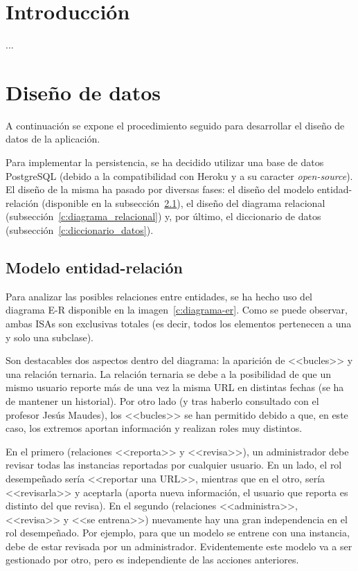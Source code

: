 
\section{Introducción}

...


\section{Diseño de datos}

A continuación se expone el procedimiento seguido para desarrollar el diseño de datos de la aplicación.

Para implementar la persistencia, se ha decidido utilizar una base de datos PostgreSQL (debido a la compatibilidad con Heroku y a su caracter \textit{open-source}). El diseño de la misma ha pasado por diversas fases: el diseño del modelo entidad-relación (disponible en la subsección~\ref{c:diagrama_entidad_relacion}), el diseño del diagrama relacional (subsección~\ref{c:diagrama_relacional}) y, por último, el diccionario de datos (subsección~\ref{c:diccionario_datos}).


\subsection{Modelo entidad-relación}
\label{c:diagrama_entidad_relacion}

Para analizar las posibles relaciones entre entidades, se ha hecho uso del diagrama E-R disponible en la imagen~\ref{c:diagrama-er}. Como se puede observar, ambas ISAs son exclusivas totales (es decir, todos los elementos pertenecen a una y solo una subclase).

Son destacables dos aspectos dentro del diagrama: la aparición de <<bucles>> y una relación ternaria. La relación ternaria se debe a la posibilidad de que un mismo usuario reporte más de una vez la misma URL en distintas fechas (se ha de mantener un historial). Por otro lado (y tras haberlo consultado con el profesor Jesús Maudes), los <<bucles>> se han permitido debido a que, en este caso, los extremos aportan información y realizan roles muy distintos.

En el primero (relaciones <<reporta>> y <<revisa>>), un administrador debe revisar todas las instancias reportadas por cualquier usuario. En un lado, el rol desempeñado sería <<reportar una URL>>, mientras que en el otro, sería <<revisarla>> y aceptarla (aporta nueva información, el usuario que reporta es distinto del que revisa). En el segundo (relaciones <<administra>>, <<revisa>> y <<se entrena>>) nuevamente hay una gran independencia en el rol desempeñado. Por ejemplo, para que un modelo se entrene con una instancia, debe de estar revisada por un administrador. Evidentemente este modelo va a ser gestionado por otro, pero es independiente de las acciones anteriores.

